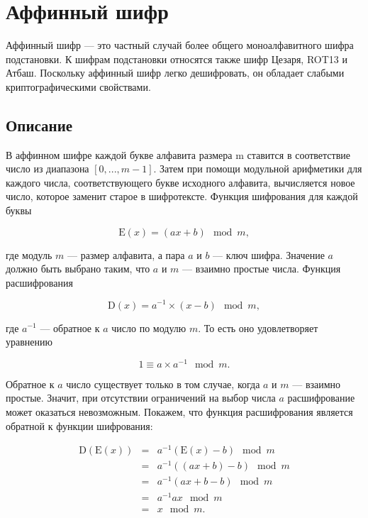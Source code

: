 \section{Аффинный шифр}

Аффинный шифр — это частный случай более общего моноалфавитного шифра 
подстановки. К шифрам подстановки относятся также шифр Цезаря, 
ROT13 и Атбаш. Поскольку аффинный шифр легко дешифровать, 
он обладает слабыми криптографическими свойствами.

\subsection{Описание}

В аффинном шифре каждой букве алфавита размера m ставится в 
соответствие число из диапазона $[0, ..., m - 1]$. 
Затем при помощи модульной арифметики для каждого числа, соответствующего 
букве исходного алфавита, вычисляется новое число, которое заменит 
старое в шифротексте. Функция шифрования для каждой буквы

    $$\mbox{E}(x) = (ax + b) \mod{m},$$

где модуль $m$ — размер алфавита, а пара $a$ и $b$ — ключ шифра. Значение 
$a$ должно быть выбрано таким, что $a$ и $m$ — взаимно простые числа. Функция 
расшифрования

    $$\mbox{D}(x) = a^{-1} \times (x - b) \mod{m},$$

где $a^{-1}$ — обратное к $a$ число по модулю $m$. То есть оно удовлетворяет 
уравнению

    $$1 \equiv a \times a^{-1} \mod{m}.$$

Обратное к $a$ число существует только в том случае, когда $a$ и $m$ — взаимно 
простые. Значит, при отсутствии ограничений на выбор числа $a$ расшифрование 
может оказаться невозможным. Покажем, что функция расшифрования является 
обратной к функции шифрования:

\begin{equation}
    \begin{matrix}
        \mbox{D}(\mbox{E}(x)) 
          &= &a^{-1} (\mbox{E}(x) - b) \mod{m} \\ 
          &= &a^{-1} ((ax + b) - b) \mod{m} \\ 
          &= &a^{-1} (ax + b - b) \mod{m} \\ 
          &= &a^{-1} ax \mod{m}\\ 
          &= &x \mod{m}. 
    \end{matrix}
\end{equation}

